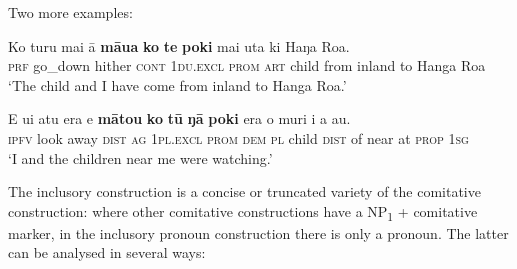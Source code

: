 Two more examples: 

\ea\label{ex:8.212}
\gll Ko turu mai {\ꞌ}ā \textbf{māua} \textbf{ko} \textbf{te} \textbf{poki} mai {\ꞌ}uta ki Haŋa Roa. \\
\textsc{prf} go\_down hither \textsc{cont} \textsc{1du.excl} \textsc{prom} \textsc{art} child from inland to Hanga Roa \\

\glt 
‘The child and I have come from inland to Hanga Roa.’ \textstyleExampleref{[R229.209]} 
\z

\ea\label{ex:8.213}
\gll E u{\ꞌ}i atu era e \textbf{mātou} \textbf{ko} \textbf{tū} \textbf{ŋā} \textbf{poki} era o muri i a au. \\
\textsc{ipfv} look away \textsc{dist} \textsc{ag} \textsc{1pl.excl} \textsc{prom} \textsc{dem} \textsc{pl} child \textsc{dist} of near at \textsc{prop} \textsc{1sg} \\

\glt
‘I and the children near me were watching.’ \textstyleExampleref{[R379.023]} 
\z

The inclusory construction is a concise or truncated variety of the comitative construction: where other comitative constructions have a NP\textsubscript{1} + comitative marker, in the inclusory pronoun construction there is only a pronoun. The latter can be analysed in several ways: 

